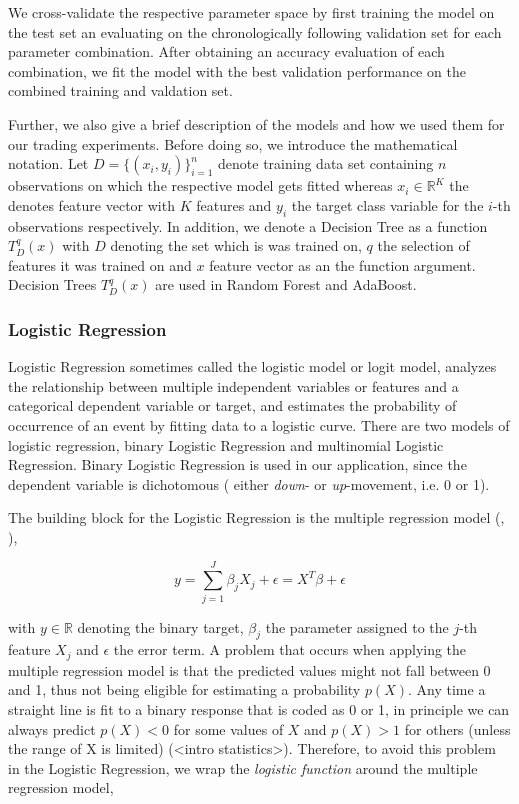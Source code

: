 We cross-validate the respective parameter space by first training the model
on the test set an evaluating on the chronologically following validation set for each parameter combination.
After obtaining an accuracy evaluation of each combination, we fit the model with the best validation performance on
the combined training and valdation set.

Further, we also give a brief description of the models and how we used them for our trading experiments.
Before doing so, we introduce the mathematical notation. 
Let $ D = \{ (x_{i}, y_{i}) \}_{i=1}^{n} $ denote training data set containing $ n $ observations on which the respective model gets fitted
whereas $ x_{i} \in \mathbb{R}^{K} $ the denotes feature vector with $K$ features and $ y_{i} $ the target class variable for the $ i $-th observations respectively.
In addition, we denote a Decision Tree \cite{breiman1984decisionTree} as a function $ T_{D}^{q}(x) $ with $ D $ denoting the set which is was trained on,
$ q $ the selection of features it was trained on and $ x $ feature vector as an the function argument.
Decision Trees $ T_{D}^{q}(x) $ are used in Random Forest and AdaBoost.




\subsubsection{Logistic Regression} \label{ch:logistic_regression}
Logistic Regression sometimes called the logistic model or logit model,
analyzes the relationship between multiple independent variables or features and a
categorical dependent variable or target, and estimates the probability of occurrence
of an event by fitting data to a logistic curve. There are two models
of logistic regression, binary Logistic Regression and multinomial Logistic
Regression. Binary Logistic Regression is used in our application, since the dependent
variable is dichotomous ( either \emph{down}- or \emph{up}-movement, i.e. 0 or 1).

The building block for the Logistic Regression is the multiple regression model (\cite{james2013statisticalLearning}, \cite{park2013logisticRegression}),


\begin{equation}
    y = \sum_{j=1}^{J} \beta_{j} X_{j} + \epsilon =  X^{T}\beta + \epsilon
\end{equation}

with $y \in \mathbb{R}$ denoting the binary target, $\beta_{j}$ the parameter assigned to the $j$-th feature $X_{j}$ 
and $\epsilon$ the error term.
A problem that occurs when applying the multiple regression model is that the predicted values might
not fall between 0 and 1, thus not being eligible for estimating a probability $p(X)$.
Any time a straight line is fit to a binary response that is coded as
0 or 1, in principle we can always predict $p(X) < 0$ for some values of $X$
and $p(X) > 1$ for others (unless the range of X is limited) (<intro statistics>).
Therefore, to avoid this problem in the Logistic Regression, 
we wrap the \emph{logistic function} around the multiple regression model,

